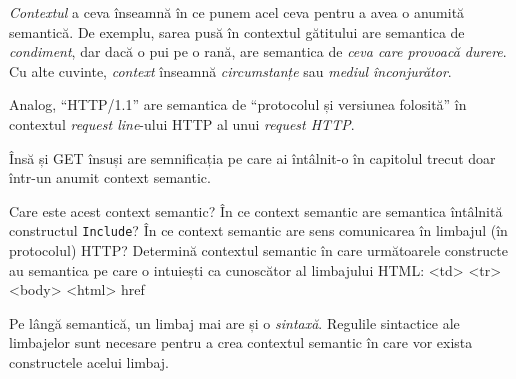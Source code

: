 \textsl{Contextul} a ceva înseamnă în ce punem acel ceva pentru a
avea o anumită semantică. De exemplu, sarea pusă în contextul
gătitului are semantica de \textit{condiment}, dar dacă
o pui pe o rană, are semantica de \textit{ceva care provoacă durere}.
Cu alte cuvinte, \textsl{context} înseamnă
\textsl{circumstanțe} sau \textsl{mediul înconjurător}. 

Analog, ``HTTP/1.1'' are semantica de ``protocolul și versiunea folosită''
în contextul \textit{request line}-ului HTTP al unui \textit{request HTTP}.

\begin{Exercise}[title={Întrebări de sinteză},difficulty=2]
Însă și GET însuși are semnificația pe care ai întâlnit-o în capitolul
trecut doar într-un anumit context semantic.

\Question Care este acest context semantic?
\Question În ce context semantic are semantica întâlnită constructul \texttt{Include}?
\Question În ce context semantic are sens comunicarea în limbajul (în protocolul) HTTP?
\ExeText Determină contextul semantic în care următoarele constructe au semantica pe
care o intuiești ca cunoscător al limbajului HTML:
\Question <td>
\Question <tr>
\Question <body>
\Question <html>
\Question href
\end{Exercise}



Pe lângă semantică, un limbaj mai are și o \textsl{sintaxă}. Regulile sintactice
ale limbajelor sunt necesare pentru a crea contextul semantic în
care vor exista constructele acelui limbaj.

